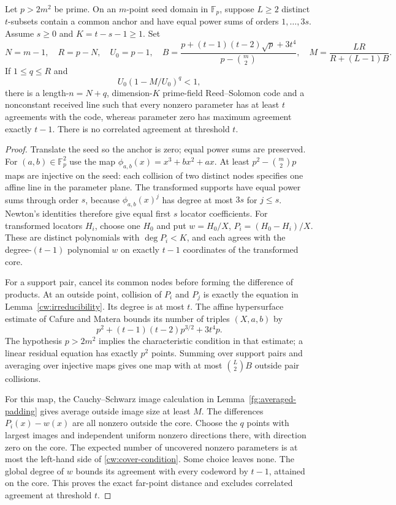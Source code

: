 \begin{lemma}
\label{cw:finite}
Let $p>2m^2$ be prime. On an $m$-point seed domain in $\mathbb F_p$,
suppose $L\ge2$ distinct $t$-subsets contain a common anchor and have
equal power sums of orders $1,\ldots,3s$. Assume $s\ge0$ and
$K=t-s-1\ge1$. Set
\[
 N=m-1,\quad R=p-N,\quad U_0=p-1,\quad
 B=\frac{p+(t-1)(t-2)\sqrt p+3t^4}{p-\binom m2},\quad
 M=\frac{LR}{R+(L-1)B}.
\]
If $1\le q\le R$ and
\begin{equation}\label{cw:cover-condition}
 U_0(1-M/U_0)^q<1,
\end{equation}
there is a length-$n=N+q$, dimension-$K$ prime-field Reed--Solomon code
and a nonconstant received line such that every nonzero parameter has
at least $t$ agreements with the code, whereas parameter zero has
maximum agreement exactly $t-1$. There is no correlated agreement
at threshold $t$.
\end{lemma}
\begin{proof}
Translate the seed so the anchor is zero; equal power sums are preserved.
For $(a,b)\in\mathbb F_p^2$ use the map
$\phi_{a,b}(x)=x^3+bx^2+ax$.
At least $p^2-\binom m2p$ maps are injective on the seed: each collision
of two distinct nodes specifies one affine line in the parameter plane.
The transformed supports have equal power sums through order $s$,
because $\phi_{a,b}(x)^j$ has degree at most $3s$ for $j\le s$.
Newton's identities therefore give equal first $s$ locator coefficients.
For transformed locators $H_i$, choose one $H_0$ and put
$w=H_0/X$, $P_i=(H_0-H_i)/X$. These are distinct polynomials with
$\deg P_i<K$, and each agrees with the degree-$(t-1)$ polynomial $w$
on exactly $t-1$ coordinates of the transformed core.

For a support pair, cancel its common nodes before forming the difference
of products. At an outside point, collision of $P_i$ and $P_j$ is
exactly the equation in Lemma~\ref{cw:irreducibility}. Its degree is at
most $t$. The affine hypersurface estimate of Cafure and Matera
\cite[Corollary~5.6]{cafure-matera} bounds its number of triples $(X,a,b)$ by
\[
 p^2+(t-1)(t-2)p^{3/2}+3t^4p.
\]
The hypothesis $p>2m^2$ implies the characteristic condition in that
estimate; a linear residual equation has exactly $p^2$ points.
Summing over support pairs and averaging over injective maps gives
one map with at most $\binom L2B$ outside pair collisions.

For this map, the Cauchy--Schwarz image calculation in
Lemma~\ref{fg:averaged-padding} gives average outside image size at
least $M$. The differences $P_i(x)-w(x)$ are all nonzero outside the
core. Choose the $q$ points with largest images and independent uniform
nonzero directions there, with direction zero on the core.
The expected number of uncovered nonzero parameters is at most the
left-hand side of \eqref{cw:cover-condition}. Some choice leaves none.
The global degree of $w$ bounds its agreement with every codeword by
$t-1$, attained on the core. This proves the exact far-point distance
and excludes correlated agreement at threshold $t$.
\end{proof}

